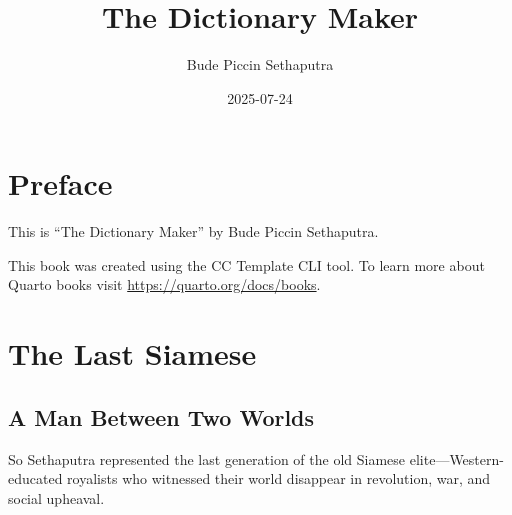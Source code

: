 \documentclass[
  Letterpaper,
]{scrbook}
\title{The Dictionary Maker}
\author{Bude Piccin Sethaputra}
\date{2025-07-24}
\renewcommand*\contentsname{Table of contents}
\newcommand\contentsname{Table of contents}
\begin{document}
\frontmatter
\maketitle

\renewcommand*\contentsname{Table of contents}
{
\setcounter{tocdepth}{1}
\tableofcontents
}

\mainmatter
{}

\chapter*{Preface}\label{preface}


This is ``The Dictionary Maker'' by Bude Piccin Sethaputra.

This book was created using the CC Template CLI tool. To learn more
about Quarto books visit \url{https://quarto.org/docs/books}.


\chapter{The Last Siamese}\label{sec-last-siamese}

\section{A Man Between Two Worlds}\label{a-man-between-two-worlds}

So Sethaputra represented the last generation of the old Siamese
elite---Western-educated royalists who witnessed their world disappear
in revolution, war, and social upheaval.
\end{document}
